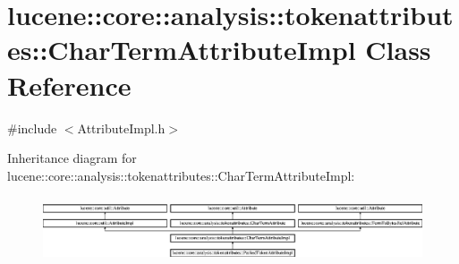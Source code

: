 \hypertarget{classlucene_1_1core_1_1analysis_1_1tokenattributes_1_1CharTermAttributeImpl}{}\section{lucene\+:\+:core\+:\+:analysis\+:\+:tokenattributes\+:\+:Char\+Term\+Attribute\+Impl Class Reference}
\label{classlucene_1_1core_1_1analysis_1_1tokenattributes_1_1CharTermAttributeImpl}


{\ttfamily \#include $<$Attribute\+Impl.\+h$>$}

Inheritance diagram for lucene\+:\+:core\+:\+:analysis\+:\+:tokenattributes\+:\+:Char\+Term\+Attribute\+Impl\+:\begin{figure}[H]
\begin{center}
\leavevmode
\includegraphics[height=1.964912cm]{classlucene_1_1core_1_1analysis_1_1tokenattributes_1_1CharTermAttributeImpl}
\end{center}
\end{figure}
